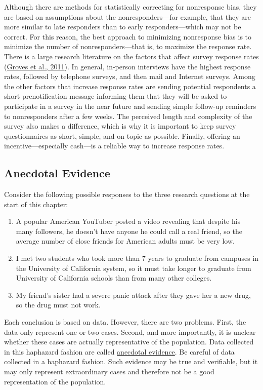 \documentclass[
]{krantz}
\providecommand{\tightlist}{%
  \setlength{\itemsep}{0pt}\setlength{\parskip}{0pt}}
\begin{document}
Although there are methods for statistically correcting for nonresponse bias, they are based on assumptions about the nonresponders---for example, that they are more similar to late responders than to early responders---which may not be correct. For this reason, the best approach to minimizing nonresponse bias is to minimize the number of nonresponders---that is, to maximize the response rate. There is a large research literature on the factors that affect survey response rates (\protect\hyperlink{ref-groves2011survey}{Groves et al., 2011}). In general, in-person interviews have the highest response rates, followed by telephone surveys, and then mail and Internet surveys. Among the other factors that increase response rates are sending potential respondents a short prenotification message informing them that they will be asked to participate in a survey in the near future and sending simple follow-up reminders to nonresponders after a few weeks. The perceived length and complexity of the survey also makes a difference, which is why it is important to keep survey questionnaires as short, simple, and on topic as possible. Finally, offering an incentive---especially cash---is a reliable way to increase response rates.

\hypertarget{anecdotal-evidence}{%
\subsection*{Anecdotal Evidence}\label{anecdotal-evidence}}


Consider the following possible responses to the three research questions at the start of this chapter:

\begin{enumerate}
\def\labelenumi{\arabic{enumi}.}
\tightlist
\item
  A popular American YouTuber posted a video revealing that despite his many followers, he doesn't have anyone he could call a real friend, so the average number of close friends for American adults must be very low.
\item
  I met two students who took more than 7 years to graduate from campuses in the University of California system, so it must take longer to graduate from University of California schools than from many other colleges.
\item
  My friend's sister had a severe panic attack after they gave her a new drug, so the drug must not work.
\end{enumerate}

Each conclusion is based on data. However, there are two problems. First, the data only represent one or two cases. Second, and more importantly, it is unclear whether these cases are actually representative of the population. Data collected in this haphazard fashion are called \protect\hyperlink{anecdotal-evidence-1}{anecdotal evidence}. Be careful of data collected in a haphazard fashion. Such evidence may be true and verifiable, but it may only represent extraordinary cases and therefore not be a good representation of the population.
\end{document}

